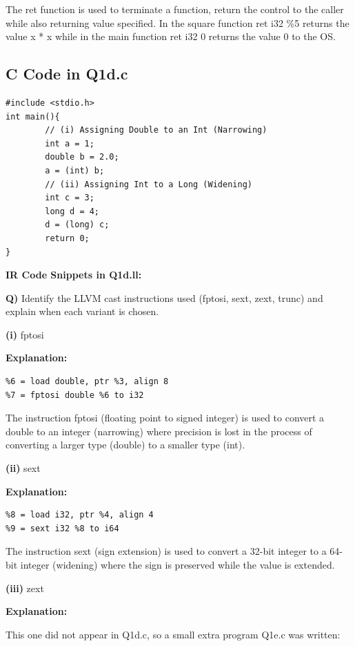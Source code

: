 The ret function is used to terminate a function, return the control to the caller while also returning value specified. In the square function ret i32 \%5 returns the value x * x while in the main function ret i32 0 returns the value 0 to the OS.


\subsection{C Code in Q1d.c}

\begin{lstlisting}
#include <stdio.h>
int main(){
        // (i) Assigning Double to an Int (Narrowing)
        int a = 1;
        double b = 2.0;
        a = (int) b;
        // (ii) Assigning Int to a Long (Widening)
        int c = 3;
        long d = 4;
        d = (long) c;
        return 0;
}
\end{lstlisting}

\medskip\noindent\textbf{IR Code Snippets in Q1d.ll:}\par

\textbf{Q)} Identify the LLVM cast instructions used (fptosi, sext, zext, trunc) and explain when each variant is chosen.


\textbf{(i)} fptosi


\textbf{Explanation:} 


\begin{lstlisting}
%6 = load double, ptr %3, align 8
%7 = fptosi double %6 to i32
\end{lstlisting}

The instruction fptosi (floating point to signed integer) is used to convert a double to an integer (narrowing) where precision is lost in the process of converting a larger type (double) to a smaller type (int).


\textbf{(ii) }sext


\textbf{Explanation:} 


\begin{lstlisting}
%8 = load i32, ptr %4, align 4
%9 = sext i32 %8 to i64
\end{lstlisting}

The instruction sext (sign extension) is used to convert a 32-bit integer to a 64-bit integer (widening) where the sign is preserved while the value is extended.


\textbf{(iii)} zext


\textbf{Explanation:} 


This one did not appear in Q1d.c, so a small extra program Q1e.c was written:


